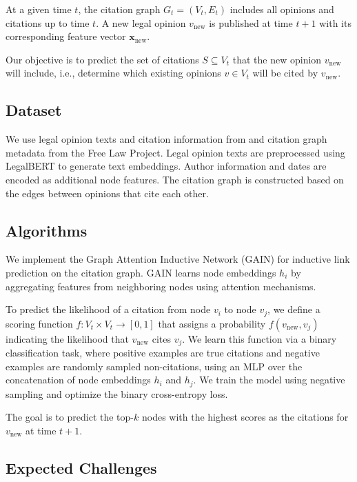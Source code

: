 \documentclass{article}
\begin{document}
At a given time \( t \), the citation graph \( G_t = (V_t, E_t) \) includes all opinions and citations up to time \( t \). A new legal opinion \( v_{\text{new}} \) is published at time \( t+1 \) with its corresponding feature vector \( \mathbf{x}_{\text{new}} \).

Our objective is to predict the set of citations \( S \subseteq V_t \) that the new opinion \( v_{\text{new}} \) will include, i.e., determine which existing opinions \( v \in V_t \) will be cited by \( v_{\text{new}} \). 


\subsection{Dataset}

We use legal opinion texts and citation information from \citet{mahari-etal-2024-lepard} and citation graph metadata from the Free Law Project. Legal opinion texts are preprocessed using LegalBERT \citep{chalkidis-etal-2020-legalbert} to generate text embeddings. Author information and dates are encoded as additional node features. The citation graph is constructed based on the edges between opinions that cite each other.

\subsection{Algorithms}

We implement the Graph Attention Inductive Network (GAIN) \citep{weng2022gain} for inductive link prediction on the citation graph. GAIN learns node embeddings $h_i$ by aggregating features from neighboring nodes using attention mechanisms.

To predict the likelihood of a citation from node $v_i$ to node $v_j$, we define a scoring function \( f: V_t \times V_t \rightarrow [0, 1] \) that assigns a probability \( f(v_{\text{new}}, v_j) \) indicating the likelihood that \( v_{\text{new}} \) cites \( v_j \). We learn this function via a binary classification task, where positive examples are true citations and negative examples are randomly sampled non-citations, using an MLP over the concatenation of node embeddings \( h_i \) and \( h_j \). We train the model using negative sampling and optimize the binary cross-entropy loss.

The goal is to predict the top-\( k \) nodes with the highest scores as the citations for \( v_{\text{new}} \) at time \( t+1 \).

\subsection{Expected Challenges}
\end{document}
